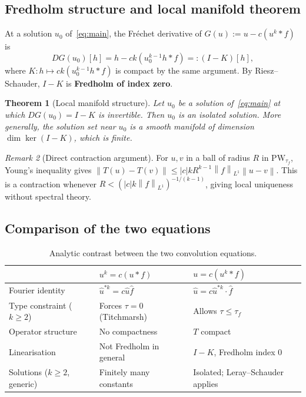 \documentclass[12pt]{article}
\newtheorem{theorem}{Theorem}[section]
\theoremstyle{definition}
\theoremstyle{remark}
\newtheorem{remark}[theorem]{Remark}
\newcommand{\PW}{\mathrm{PW}}
\newcommand{\wh}{\widehat}
\newcommand{\abs}[1]{\left|#1\right|}
\newcommand{\norm}[1]{\left\|#1\right\|}
\begin{document}
\subsection{Fredholm structure and local manifold theorem}

At a solution $u_0$ of~\eqref{eq:main}, the Fr\'echet derivative of
$G(u):=u-c(u^k\ast f)$ is
\[
  DG(u_0)[h] = h - ck(u_0^{k-1}h\ast f) =: (I-K)[h],
\]
where $K:h\mapsto ck(u_0^{k-1}h\ast f)$ is compact by the same argument.
By Riesz--Schauder, $I-K$ is \textbf{Fredholm of index zero}.

\begin{theorem}[Local manifold structure]
  \label{thm:local-mfd}
  Let $u_0$ be a solution of~\eqref{eq:main} at which $DG(u_0)=I-K$ is
  invertible.  Then $u_0$ is an isolated solution.  More generally, the
  solution set near $u_0$ is a smooth manifold of dimension
  $\dim\ker(I-K)$, which is finite.
\end{theorem}

\begin{remark}[Direct contraction argument]
  For $u,v$ in a ball of radius $R$ in $\PW_{\tau_f}$, Young's inequality
  gives
  $\norm{T(u)-T(v)} \leq \abs{c}kR^{k-1}\norm{f}_{L^1}\norm{u-v}$.
  This is a contraction whenever $R<(\abs{c}k\norm{f}_{L^1})^{-1/(k-1)}$,
  giving local uniqueness without spectral theory.
\end{remark}

\subsection{Comparison of the two equations}

\renewcommand{\arraystretch}{1.5}
\begin{table}[h]
\centering
\begin{tabular}{lll}
\hline
& $u^k=c(u\ast f)$ & $u=c(u^k\ast f)$ \\
\hline
Fourier identity & $\wh u^{\ast k}=c\wh u\wh f$ &
  $\wh u=c\wh u^{\ast k}\cdot\wh f$ \\
Type constraint ($k\geq 2$) & Forces $\tau=0$ (Titchmarsh) &
  Allows $\tau\leq\tau_f$ \\
Operator structure & No compactness & $T$ compact \\
Linearisation & Not Fredholm in general &
  $I-K$, Fredholm index $0$ \\
Solutions ($k\geq 2$, generic) &
  Finitely many constants & Isolated; Leray--Schauder applies \\
\hline
\end{tabular}
\caption{Analytic contrast between the two convolution equations.}
\end{table}
\end{document}
